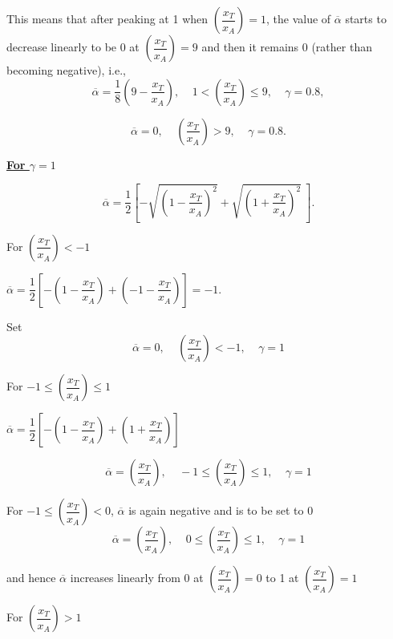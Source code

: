 This means that after peaking at 1 when $(\dfrac{x_T}{x_A})=1$, the value of $\overline{\alpha}$ starts to decrease linearly to be 0 at $(\dfrac{x_T}{x_A})=9$ and then it remains 0 (rather than becoming negative), i.e.,
\begin{equation}
\overline{\alpha}=\dfrac{1}{8}(9-\dfrac{x_T}{x_A}), \ \ \ \ \ 1<(\dfrac{x_T}{x_A})\leq 9,\ \ \ \ \ \gamma=0.8,
\end{equation}

\begin{equation}
\overline{\alpha}=0,\ \ \ \ \ (\dfrac{x_T}{x_A})>9,\ \ \ \ \ \gamma=0.8.
\end{equation}


\textbf{\underline{For $\gamma=1$}}

\begin{equation}
\overline{\alpha}= \dfrac{1}{2}[-\sqrt{(1-\dfrac{x_T}{x_A})^2}+ \sqrt{(1+\dfrac{x_T}{x_A})^2}\ ].
\end{equation}

For $(\dfrac{x_T}{x_A})<-1$\\
\begin{center}
$\overline{\alpha}= \dfrac{1}{2}[-(1-\dfrac{x_T}{x_A})+ (-1-\dfrac{x_T}{x_A})]=-1$.
\end{center}

Set
\begin{equation}
\overline{\alpha}=0,\ \ \ \ \ (\dfrac{x_T}{x_A})<-1,\ \ \ \ \ \gamma=1
\end{equation}

For $-1\leq (\dfrac{x_T}{x_A})\leq 1$\\
\begin{center}
$\overline{\alpha}=\dfrac{1}{2}[-(1-\dfrac{x_T}{x_A})+ (1+\dfrac{x_T}{x_A})]$
\end{center}
\begin{equation}
\overline{\alpha}=(\dfrac{x_T}{x_A}),\ \ \ \ \ -1\leq(\dfrac{x_T}{x_A})\leq1,\ \ \ \ \ \gamma=1
\end{equation}

For $-1\leq(\dfrac{x_T}{x_A})<0$,  $\overline{\alpha}$ is again negative and is to be set to 0
\begin{equation}
\overline{\alpha}= (\dfrac{x_T}{x_A}),\ \ \ \ \ 0\leq(\dfrac{x_T}{x_A})\leq1,\ \ \ \ \ \gamma=1
\end{equation}

and hence $\overline{\alpha}$ increases linearly from 0 at $(\dfrac{x_T}{x_A})=0$ to 1 at $(\dfrac{x_T}{x_A})=1$

For $(\dfrac{x_T}{x_A})>1$


